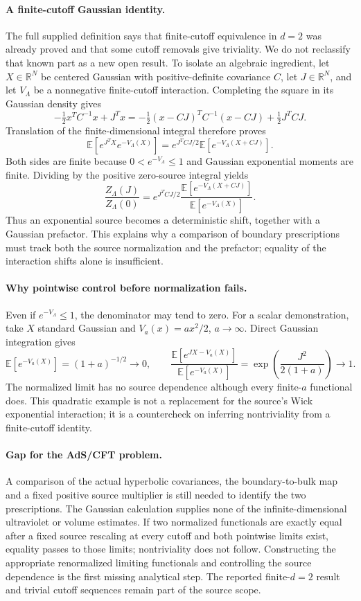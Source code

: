\documentclass[11pt]{article}
\begin{document}
\paragraph{A finite-cutoff Gaussian identity.}
The full supplied definition says that finite-cutoff equivalence in $d=2$ was already proved and that some cutoff removals give triviality. We do not reclassify that known part as a new open result. To isolate an algebraic ingredient, let $X\in\mathbb R^N$ be centered Gaussian with positive-definite covariance $C$, let $J\in\mathbb R^N$, and let $V_\Lambda$ be a nonnegative finite-cutoff interaction. Completing the square in its Gaussian density gives
\[
 -\tfrac12x^TC^{-1}x+J^Tx
 =-\tfrac12(x-CJ)^TC^{-1}(x-CJ)+\tfrac12J^TCJ.
\]
Translation of the finite-dimensional integral therefore proves
\[
 \mathbb E[e^{J^TX}e^{-V_\Lambda(X)}]
 =e^{J^TCJ/2}\mathbb E[e^{-V_\Lambda(X+CJ)}].
\]
Both sides are finite because $0<e^{-V_\Lambda}\leq1$ and Gaussian exponential moments are finite. Dividing by the positive zero-source integral yields
\[
 \frac{Z_\Lambda(J)}{Z_\Lambda(0)}
 =e^{J^TCJ/2}
 \frac{\mathbb E[e^{-V_\Lambda(X+CJ)}]}
      {\mathbb E[e^{-V_\Lambda(X)}]}.
\]
Thus an exponential source becomes a deterministic shift, together with a Gaussian prefactor. This explains why a comparison of boundary prescriptions must track both the source normalization and the prefactor; equality of the interaction shifts alone is insufficient.

\paragraph{Why pointwise control before normalization fails.}
Even if $e^{-V_\Lambda}\leq1$, the denominator may tend to zero. For a scalar demonstration, take $X$ standard Gaussian and $V_a(x)=a x^2/2$, $a\to\infty$. Direct Gaussian integration gives
\[
 \mathbb E[e^{-V_a(X)}]=(1+a)^{-1/2}\longrightarrow0,
 \qquad
 \frac{\mathbb E[e^{JX-V_a(X)}]}{\mathbb E[e^{-V_a(X)}]}
 =\exp\left(\frac{J^2}{2(1+a)}\right)\longrightarrow1.
\]
The normalized limit has no source dependence although every finite-$a$ functional does. This quadratic example is not a replacement for the source's Wick exponential interaction; it is a countercheck on inferring nontriviality from a finite-cutoff identity.

\paragraph{Gap for the AdS/CFT problem.}
A comparison of the actual hyperbolic covariances, the boundary-to-bulk map and a fixed positive source multiplier is still needed to identify the two prescriptions. The Gaussian calculation supplies none of the infinite-dimensional ultraviolet or volume estimates. If two normalized functionals are exactly equal after a fixed source rescaling at every cutoff and both pointwise limits exist, equality passes to those limits; nontriviality does not follow. Constructing the appropriate renormalized limiting functionals and controlling the source dependence is the first missing analytical step. The reported finite-$d=2$ result and trivial cutoff sequences remain part of the source scope.
\end{document}
